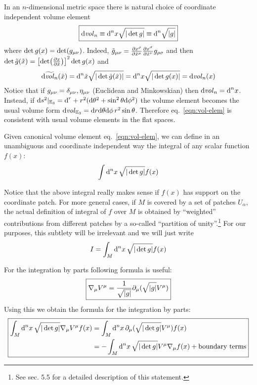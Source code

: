 \documentclass[../main/main.tex]{subfiles}
\begin{document}
In an $n$-dimensional metric space there is natural choice of coordinate independent volume element
\begin{equation}\label{eqn:vol-elem}\boxed{
\text{d\emph{vol}}_{n}\equiv\textup{d}^nx\sqrt{\vert\det g\vert}\equiv\textup{d}^n\sqrt{\vert g\vert}
}\end{equation}
where $\det g(x)=\det(g_{\mu \nu})$. Indeed, $\tilde g_{\mu \nu}=\frac{\partial x^\rho}{\partial \hat x^\mu}\frac{\partial x^\sigma}{\partial \hat x^\nu}g_{\rho \sigma}$ and then $\det\tilde g(\tilde x)=\left[\det(\frac{\partial x}{\partial \tilde x})\right]^2\det g(x)$ and
\[\textup{d}\widetilde{\text{\emph{vol}}}_n(\tilde x)=\textup{d}^n\tilde x\sqrt{\vert\det \tilde g(\tilde x)\vert}=\textup{d}^n x\sqrt{\vert\det  g( x)\vert}=\text{d\emph{vol}}_{n}(x)\]
Notice that if $g_{\mu \nu}=\delta_{\mu\nu},\eta_{\mu\nu}$ (Euclidean and Minkowskian) then $\text{d\emph{vol}}_{n}=\textup{d}^n x$. Instead, if $\textup{d} s^2\vert_{\mathbb E_3}=\textup{d}^r+r^2(\textup{d}\theta^2+\sin^2\theta\textup{d}\phi^2)$ the volume element becomes the usual volume form $\text{d\emph{vol}}_{\mathbb E_3}=\textup{d} r\textup{d}\theta\textup{d}\phi\,r^2\sin\theta$. Therefore eq.~\eqref{eqn:vol-elem} is consistent with usual volume elements in the flat spaces. 

Given canonical volume element eq.~\eqref{eqn:vol-elem}, we can define in an unambiguous and coordinate independent way the integral of any scalar function $f(x)$:
\[\int\textup{d}^nx\,\sqrt{\vert\det g\vert}f(x)\]

Notice that the above integral really makes sense if $f(x)$ has support on the coordinate patch. For more general cases, if $ M$ is covered by a set of patches $U_\alpha$, the actual definition of integral of $f$ over $ M$ is obtained by ``weighted'' contributions from different patches by a so-called ``partition of unity''.\footnote{See \cite{Nakahara:2003aa} sec. 5.5 for a detailed description of this statement.} For our purposes, this subtlety will be irrelevant and we will just write
\[I=\int_M\textup{d}^nx\,\sqrt{\vert\det g\vert}f(x)\]

For the integration by parts following formula is useful:
\begin{equation}\boxed{
\nabla_\mu V^\mu=\frac1{\sqrt{\vert g\vert}}\partial_{\mu}(\sqrt{\vert g\vert}V^\mu)
}\end{equation}
Using this we obtain the formula for the integration by parts:
\begin{equation}\boxed{\begin{split}
\int_M\textup{d}^nx\,\sqrt{\vert\det g\vert}\nabla_\mu V^\mu f(x)
&=\int_M\textup{d}^nx\,\partial_{\mu}(\sqrt{\vert\det g\vert}V^\mu) f(x)\\
&=-\int_M\textup{d}^nx\,\sqrt{\vert\det g\vert} V^\mu \nabla_\mu f(x)+\text{boundary terms}
\end{split}}\end{equation}
\end{document}
